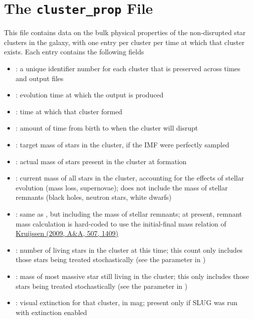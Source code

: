 \documentclass[letterpaper,10pt,english]{sphinxmanual}
\begin{document}
\section{The \texttt{cluster\_prop} File}
\label{output:the-cluster-prop-file}
This file contains data on the bulk physical properties of the non-disrupted star clusters in the galaxy, with one entry per cluster per time at which that cluster exists. Each entry contains the following fields
\begin{itemize}
\item {} 
: a unique identifier number for each cluster that is preserved across times and output files

\item {} 
: evolution time at which the output is produced

\item {} 
: time at which that cluster formed

\item {} 
: amount of time from birth to when the cluster will disrupt

\item {} 
: target mass of stars in the cluster, if the IMF were perfectly sampled

\item {} 
: actual mass of stars present in the cluster at formation

\item {} 
: current mass of all stars in the cluster, accounting for the effects of stellar evolution (mass loss, supernovae); does not include the mass of stellar remnants (black holes, neutron stars, white dwarfs)

\item {} 
: same as , but including the mass of stellar remnants; at present, remnant mass calculation is hard-coded to use the initial-final mass relation of \href{http://adsabs.harvard.edu/abs/2009A\%26A...507.1409K}{Kruijssen (2009, A\&A, 507, 1409)}

\item {} 
: number of living stars in the cluster at this time; this count only includes those stars being treated stochastically (see the parameter  in {\hyperref[parameters:ssec-stellar-keywords]{\emph{}}})

\item {} 
: mass of most massive star still living in the cluster; this only includes those stars being treated stochastically (see the parameter  in {\hyperref[parameters:ssec-stellar-keywords]{\emph{}}})

\item {} 
: visual extinction for that cluster, in mag; present only if SLUG was run with extinction enabled

\end{itemize}
\end{document}
